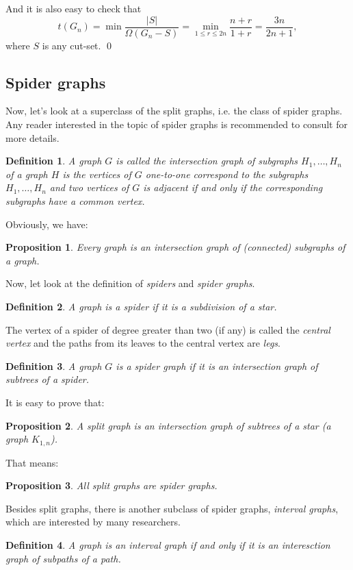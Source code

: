 \documentclass[12pt]{report}
\newtheorem{definition}{Definition}
\newtheorem{proposition}{Proposition}
\begin{document}
And it is also easy to check that $$t(G_n)=\min\frac{|S|}{\Omega(G_n-S)}=\min_{1\le r\le 2n}\frac{n+r}{1+r}=\frac{3n}{2n+1},$$where $S$ is any cut-set.
\qed



\subsection{Spider graphs}

Now, let's look at a superclass of the split graphs, i.e. the class of spider graphs. Any reader interested in the topic of spider graphs is recommended to consult \cite{kaiser2007tough} for more details.
\begin{definition}
A graph $G$ is called the intersection graph of subgraphs $H_1,\ldots,H_n$ of a graph $H$ is the vertices of $G$ one-to-one correspond to the subgraphs $H_1,\ldots,H_n$ and two vertices of $G$ is adjacent if and only if the corresponding subgraphs have a common vertex.
\end{definition}
Obviously, we have:
\begin{proposition}
Every graph is an intersection graph of (connected) subgraphs of a graph. 
\end{proposition}
 Now, let look at the definition of {\em spiders} and {\em spider graphs}.
\begin{definition}
A graph is a spider if it is a subdivision of a star. 
\end{definition}
The vertex of a spider of degree greater than two (if any) is called the {\em central vertex} and the paths from its leaves to the central vertex are {\em legs}.
\begin{definition}
A graph $G$ is a spider graph if it is an intersection graph of subtrees of a spider.
\end{definition}

It is easy to prove that:
\begin{proposition}
A split graph is an intersection graph of subtrees of a star (a graph $K_{1,n}$).
\end{proposition}
That means:
\begin{proposition}\label{ss} 
All split graphs are spider graphs.
\end{proposition}

Besides split graphs, there is another subclass of spider graphs, {\em interval graphs}, which are interested by many researchers.
\begin{definition}
A graph is an interval graph if and only if it is an interesction graph of subpaths of a path.
\end{definition}
\end{document}
